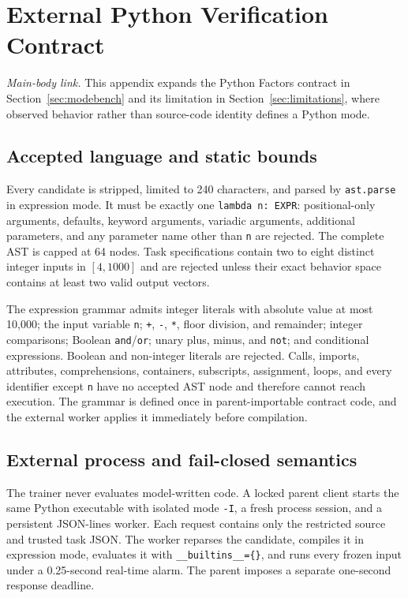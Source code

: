 \documentclass{article}
\newcommand{\1}{\mathbf 1}
\theoremstyle{remark}
\theoremstyle{definition}
\theoremstyle{plain}
\begin{document}
\section{External Python Verification Contract}
\label{app:python}

\noindent\emph{Main-body link.} This appendix expands the Python Factors
contract in Section~\ref{sec:modebench} and its limitation in
Section~\ref{sec:limitations}, where observed behavior rather than source-code
identity defines a Python mode.

\subsection{Accepted language and static bounds}
\label{app:python-language}

Every candidate is stripped, limited to 240 characters, and parsed by
\texttt{ast.parse} in expression mode. It must be exactly one
\texttt{lambda n: EXPR}: positional-only arguments, defaults, keyword
arguments, variadic arguments, additional parameters, and any parameter name
other than \texttt{n} are rejected. The complete AST is capped at 64 nodes.
Task specifications contain two to eight distinct integer inputs in
$[4,1000]$ and are rejected unless their exact behavior space contains at
least two valid output vectors.

The expression grammar admits integer literals with absolute value at most
10,000; the input variable \texttt{n}; \texttt{+}, \texttt{-},
\texttt{*}, floor division, and remainder; integer comparisons; Boolean
\texttt{and}/\texttt{or}; unary plus, minus, and \texttt{not}; and conditional
expressions. Boolean and non-integer literals are rejected. Calls, imports,
attributes, comprehensions, containers, subscripts, assignment, loops, and
every identifier except \texttt{n} have no accepted AST node and therefore
cannot reach execution. The grammar is defined once in parent-importable
contract code, and the external worker applies it immediately before
compilation.

\subsection{External process and fail-closed semantics}
\label{app:python-process}

The trainer never evaluates model-written code. A locked parent client starts
the same Python executable with isolated mode \texttt{-I}, a fresh process
session, and a persistent JSON-lines worker. Each request contains only the
restricted source and trusted task JSON. The worker reparses the candidate,
compiles it in expression mode, evaluates it with
\texttt{\_\_builtins\_\_=\{\}}, and runs every frozen input under a
0.25-second real-time alarm. The parent imposes a separate one-second response
deadline.
\end{document}
